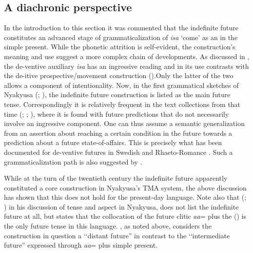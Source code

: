 \subsection{A diachronic perspective}\label{isaFutDiachronic} In the introduction to this section it was commented that the indefinite future constitutes an advanced stage of grammaticalization of \textit{isa} `come' as an  in the simple present. While the phonetic attrition is self-evident, the construction's meaning and use suggest a more complex chain of developments. As discussed in , the de-ventive auxiliary \textit{isa} has an ingressive reading and in its  use contrasts with the de-itive prospective/movement construction ().Only the latter of the two allows a component of intentionality. Now, in the first grammatical sketches of Nyakyusa (\citealt{SchumannK1899}; \citealt{EndemannC1914}), the indefinite future construction is listed as the main future tense. Correspondingly it is relatively frequent in the text collections from that time (\citealt{BergerP1933}; \citealt{BusseJ1942}; \citeyear{BusseJ1949}), where it is found with future predictions that do not necessarily involve an ingressive component. One can thus assume a semantic generalization from an assertion about reaching a certain condition in the future towards a prediction about a future state-of-affairs. This is precisely what has been documented for de-ventive futures in Swedish \citep{ChristensenL1997} and Rhaeto-Romance \citep{EbneterT1973}. Such a grammaticalization path is also suggested by \citet{TraugottE1978}.

While at the turn of the twentieth century the indefinite future apparently constituted a core construction in Nyakyusa's TMA system, the above discussion has shown that this does not hold for the present-day language. Note also that \citeauthor{LusekeloA2007} (\citeyear{LusekeloA2007}; \citeyear{LusekeloA2013}) in his discussion of tense and aspect in Nyakyusa, does not list the indefinite future at all, but states that the collocation of the future clitic \textit{aa}= plus the  () is the only future tense in this language. \citet{NurseD1979}, as noted above, considers the construction in question a \lq\lq distant future'' in contrast to the \lq\lq intermediate future'' expressed through \mbox{\textit{aa}=} plus simple present.

